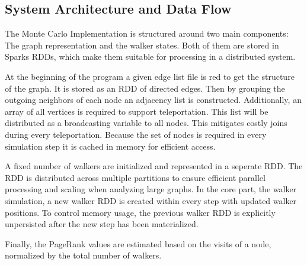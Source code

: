 \subsection{System Architecture and Data Flow}
The Monte Carlo Implementation is structured around two main components: The graph representation and the walker states. Both of them are stored in Sparks RDDs, which make them suitable for processing in a distributed system. \par
At the beginning of the program a given edge list file is red to get the structure of the graph. It is stored as an RDD of directed edges. Then by grouping the outgoing neighbors of each node an adjacency list is constructed. Additionally, an array of all vertices is required to support teleportation. This list will be distributed as a broadcasting variable to all nodes. This mitigates costly joins during every teleportation. Because the set of nodes is required in every simulation step it is cached in memory for efficient access. \par
A fixed number of walkers are initialized and represented in a seperate RDD. The RDD is distributed across multiple partitions to ensure efficient parallel processing and scaling when analyzing large graphs. In the core part, the walker simulation, a new walker RDD is created within every step with updated walker positions. To control memory usage, the previous walker RDD is explicitly unpersisted after the new step has been materialized. \par
Finally, the PageRank values are estimated based on the visits of a node, normalized by the total number of walkers. 




